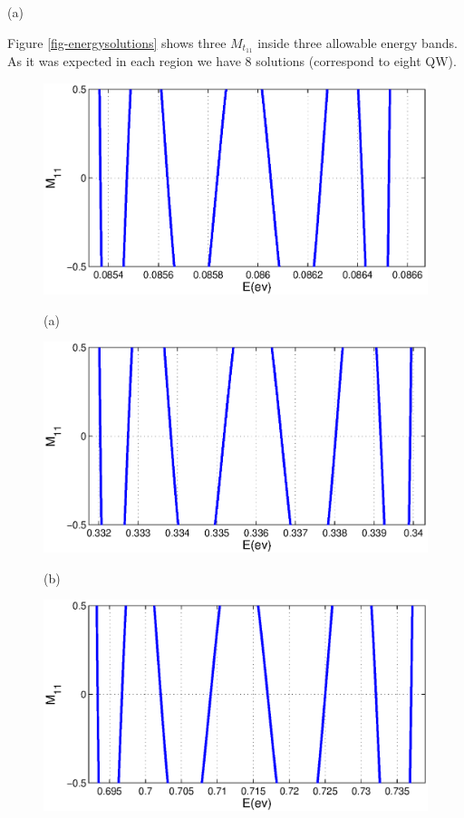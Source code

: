 \begin{homeworkProblem}
\begin{homeworkSection}{(a)}
\begin{enumerate}
\end{enumerate} 
Figure \ref{fig-energysolutions} shows three $M_t_{11}$ inside three allowable energy bands. As it was expected in each region we have 8 solutions (correspond to eight QW).
\newpage
\begin{figure}[!h]
\begin{minipage}[b]{1\linewidth}
\centering
\includegraphics[scale=0.5]{M11_1.eps}
\centerline{\small (a) }
\end{minipage}
\begin{minipage}[b]{1\linewidth}
\centering
\includegraphics[scale=0.5]{M11_2.eps}
\centerline{\small (b) }
\end{minipage}
\begin{minipage}[b]{1\linewidth}
\centering
\includegraphics[scale=0.5]{M11_3.eps}

\end{minipage}
\end{figure}
\end{homeworkSection}
\end{homeworkProblem}
